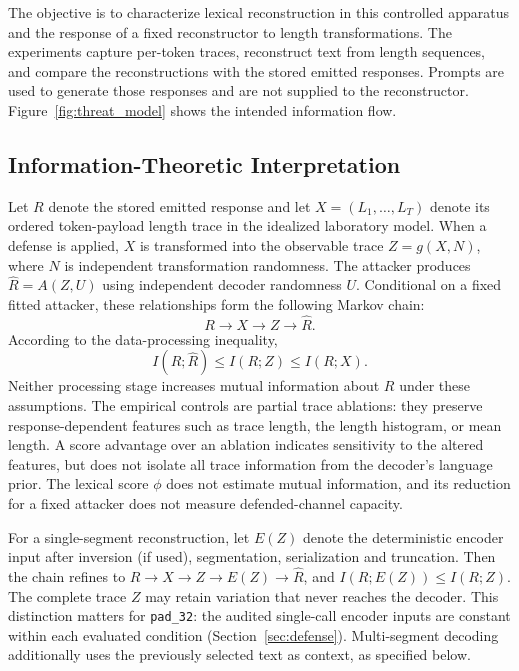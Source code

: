 \documentclass[electronics,article,submit,pdftex,moreauthors]{Definitions/mdpi}
\begin{document}
The objective is to characterize lexical reconstruction in this controlled apparatus and the response of a fixed reconstructor to length transformations. The experiments capture per-token traces, reconstruct text from length sequences, and compare the reconstructions with the stored emitted responses. Prompts are used to generate those responses and are not supplied to the reconstructor. Figure~\ref{fig:threat_model} shows the intended information flow.

\subsection{Information-Theoretic Interpretation}
Let $R$ denote the stored emitted response and let $X=(L_1,\ldots,L_T)$ denote its ordered token-payload length trace in the idealized laboratory model. When a defense is applied, $X$ is transformed into the observable trace $Z=g(X,N)$, where $N$ is independent transformation randomness. The attacker produces $\widehat{R}=A(Z,U)$ using independent decoder randomness $U$. Conditional on a fixed fitted attacker, these relationships form the following Markov chain:
\begin{equation}
R \longrightarrow X \longrightarrow Z \longrightarrow \widehat{R}.
\end{equation}
According to the data-processing inequality,
\begin{equation}
I(R;\widehat{R}) \leq I(R;Z) \leq I(R;X).
\end{equation}
Neither processing stage increases mutual information about $R$ under these assumptions. The empirical controls are partial trace ablations: they preserve response-dependent features such as trace length, the length histogram, or mean length. A score advantage over an ablation indicates sensitivity to the altered features, but does not isolate all trace information from the decoder's language prior. The lexical score $\phi$ does not estimate mutual information, and its reduction for a fixed attacker does not measure defended-channel capacity.

For a single-segment reconstruction, let $E(Z)$ denote the deterministic encoder input after inversion (if used), segmentation, serialization and truncation. Then the chain refines to $R\rightarrow X\rightarrow Z\rightarrow E(Z)\rightarrow\widehat R$, and $I(R;E(Z))\leq I(R;Z)$. The complete trace $Z$ may retain variation that never reaches the decoder. This distinction matters for \texttt{pad\_32}: the audited single-call encoder inputs are constant within each evaluated condition (Section~\ref{sec:defense}). Multi-segment decoding additionally uses the previously selected text as context, as specified below.
\end{document}
